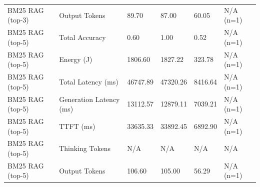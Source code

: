 \begin{table}
\begin{tabular}{llllll}
BM25 RAG (top-3) & Output Tokens & 89.70 & 87.00 & 60.05 & N/A (n=1) \\
BM25 RAG (top-5) & Total Accuracy & 0.60 & 1.00 & 0.52 & N/A (n=1) \\
BM25 RAG (top-5) & Energy (J) & 1806.60 & 1827.22 & 323.78 & N/A (n=1) \\
BM25 RAG (top-5) & Total Latency (ms) & 46747.89 & 47320.26 & 8416.64 & N/A (n=1) \\
BM25 RAG (top-5) & Generation Latency (ms) & 13112.57 & 12879.11 & 7039.21 & N/A (n=1) \\
BM25 RAG (top-5) & TTFT (ms) & 33635.33 & 33892.45 & 6892.90 & N/A (n=1) \\
BM25 RAG (top-5) & Thinking Tokens & N/A & N/A & N/A & N/A \\
BM25 RAG (top-5) & Output Tokens & 106.60 & 105.00 & 56.29 & N/A (n=1) \\
\bottomrule
\end{tabular}
\end{table}

